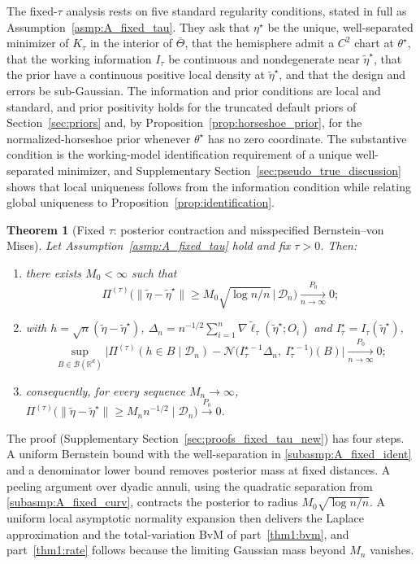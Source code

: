 \documentclass[11pt]{article}
\newtheorem{theorem}{Theorem}
\theoremstyle{definition}
\theoremstyle{plain}
\newcommand{\R}{\mathbb{R}}
\begin{document}
The fixed-$\tau$ analysis rests on five standard regularity conditions, stated in full as Assumption~\ref{asmp:A_fixed_tau}. They ask that $\eta^\star$ be the unique, well-separated minimizer of $K_\tau$ in the interior of $\bar\Theta$, that the hemisphere admit a $C^2$ chart at $\theta^\star$, that the working information $I_\tau$ be continuous and nondegenerate near $\tilde\eta^\star$, that the prior have a continuous positive local density at $\tilde\eta^\star$, and that the design and errors be sub-Gaussian. The information and prior conditions are local and standard, and prior positivity holds for the truncated default priors of Section~\ref{sec:priors} and, by Proposition~\ref{prop:horseshoe_prior}, for the normalized-horseshoe prior whenever $\theta^\star$ has no zero coordinate. The substantive condition is the working-model identification requirement of a unique well-separated minimizer, and Supplementary Section~\ref{sec:pseudo_true_discussion} shows that local uniqueness follows from the information condition while relating global uniqueness to Proposition~\ref{prop:identification}.

\begin{theorem}[Fixed $\tau$: posterior contraction and misspecified Bernstein--von Mises]
\label{thm:mis_contraction_fixed_tau_new}
Let Assumption~\ref{asmp:A_fixed_tau} hold and fix $\tau>0$. Then:
\begin{enumerate}[label=(\alph*),nosep]
\item\label{thm1:contraction} there exists $M_0<\infty$ such that
\[
\Pi^{(\tau)}\Big(\|\tilde\eta-\tilde\eta^\star\|\ge M_0\sqrt{\log n/n}\,\Big|\,\mathcal D_n\Big)\xrightarrow[n\to\infty]{P_0}0;
\]
\item\label{thm1:bvm} with $h=\sqrt n(\tilde\eta-\tilde\eta^\star)$,
$\Delta_n=n^{-1/2}\sum_{i=1}^n\nabla\tilde\ell_\tau(\tilde\eta^\star;O_i)$ and $I_\tau^\star=I_\tau(\tilde\eta^\star)$,
\[
\sup_{B\in\mathcal B(\R^d)}
\Big|\Pi^{(\tau)}(h\in B\mid\mathcal D_n)-\mathcal N\big(I_\tau^{\star-1}\Delta_n,\ I_\tau^{\star-1}\big)(B)\Big|
\xrightarrow[n\to\infty]{P_0}0;
\]
\item\label{thm1:rate} consequently, for every sequence $M_n\to\infty$,
$\Pi^{(\tau)}\big(\|\tilde\eta-\tilde\eta^\star\|\ge M_nn^{-1/2}\mid\mathcal D_n\big)\xrightarrow{P_0}0$.
\end{enumerate}
\end{theorem}

The proof (Supplementary Section~\ref{sec:proofs_fixed_tau_new}) has four steps. A uniform Bernstein bound with the well-separation in \ref{subasmp:A_fixed_ident} and a denominator lower bound removes posterior mass at fixed distances. A peeling argument over dyadic annuli, using the quadratic separation from \ref{subasmp:A_fixed_curv}, contracts the posterior to radius $M_0\sqrt{\log n/n}$. A uniform local asymptotic normality expansion then delivers the Laplace approximation and the total-variation BvM of part~\ref{thm1:bvm}, and part~\ref{thm1:rate} follows because the limiting Gaussian mass beyond $M_n$ vanishes.
\end{document}
